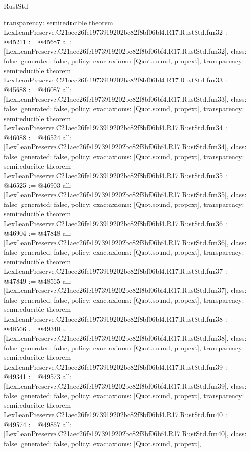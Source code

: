 \begin{lexlean}{RustStd}
\begin{coremodule}
{  transparency: semireducible
}
theorem LexLeanPreserve.C21aec26fe1973919202bc82f8bf06bf4.R17.RustStd.fun32 : @45211 := @45687 {
  all: [LexLeanPreserve.C21aec26fe1973919202bc82f8bf06bf4.R17.RustStd.fun32],
  class: false,
  generated: false,
  policy: exact{axioms: [Quot.sound, propext]},
  transparency: semireducible
}
theorem LexLeanPreserve.C21aec26fe1973919202bc82f8bf06bf4.R17.RustStd.fun33 : @45688 := @46087 {
  all: [LexLeanPreserve.C21aec26fe1973919202bc82f8bf06bf4.R17.RustStd.fun33],
  class: false,
  generated: false,
  policy: exact{axioms: [Quot.sound, propext]},
  transparency: semireducible
}
theorem LexLeanPreserve.C21aec26fe1973919202bc82f8bf06bf4.R17.RustStd.fun34 : @46088 := @46524 {
  all: [LexLeanPreserve.C21aec26fe1973919202bc82f8bf06bf4.R17.RustStd.fun34],
  class: false,
  generated: false,
  policy: exact{axioms: [Quot.sound, propext]},
  transparency: semireducible
}
theorem LexLeanPreserve.C21aec26fe1973919202bc82f8bf06bf4.R17.RustStd.fun35 : @46525 := @46903 {
  all: [LexLeanPreserve.C21aec26fe1973919202bc82f8bf06bf4.R17.RustStd.fun35],
  class: false,
  generated: false,
  policy: exact{axioms: [Quot.sound, propext]},
  transparency: semireducible
}
theorem LexLeanPreserve.C21aec26fe1973919202bc82f8bf06bf4.R17.RustStd.fun36 : @46904 := @47848 {
  all: [LexLeanPreserve.C21aec26fe1973919202bc82f8bf06bf4.R17.RustStd.fun36],
  class: false,
  generated: false,
  policy: exact{axioms: [Quot.sound, propext]},
  transparency: semireducible
}
theorem LexLeanPreserve.C21aec26fe1973919202bc82f8bf06bf4.R17.RustStd.fun37 : @47849 := @48565 {
  all: [LexLeanPreserve.C21aec26fe1973919202bc82f8bf06bf4.R17.RustStd.fun37],
  class: false,
  generated: false,
  policy: exact{axioms: [Quot.sound, propext]},
  transparency: semireducible
}
theorem LexLeanPreserve.C21aec26fe1973919202bc82f8bf06bf4.R17.RustStd.fun38 : @48566 := @49340 {
  all: [LexLeanPreserve.C21aec26fe1973919202bc82f8bf06bf4.R17.RustStd.fun38],
  class: false,
  generated: false,
  policy: exact{axioms: [Quot.sound, propext]},
  transparency: semireducible
}
theorem LexLeanPreserve.C21aec26fe1973919202bc82f8bf06bf4.R17.RustStd.fun39 : @49341 := @49573 {
  all: [LexLeanPreserve.C21aec26fe1973919202bc82f8bf06bf4.R17.RustStd.fun39],
  class: false,
  generated: false,
  policy: exact{axioms: [Quot.sound, propext]},
  transparency: semireducible
}
theorem LexLeanPreserve.C21aec26fe1973919202bc82f8bf06bf4.R17.RustStd.fun40 : @49574 := @49867 {
  all: [LexLeanPreserve.C21aec26fe1973919202bc82f8bf06bf4.R17.RustStd.fun40],
  class: false,
  generated: false,
  policy: exact{axioms: [Quot.sound, propext]},
}
\end{coremodule}
\end{lexlean}

